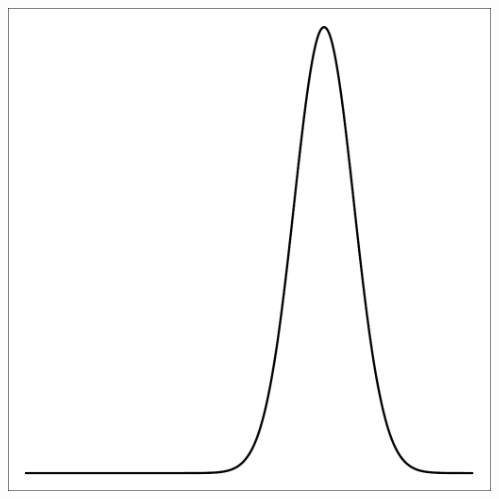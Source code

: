 \documentclass{beamer}
\begin{document}
\begin{frame}[t]
\begin{columns}[c]
\begin{flushright}
            \end{flushright}
            \begin{flushright}
                \includegraphics[width=1\textwidth]{bayesian_update_illustration_th3.pdf}
            \end{flushright}
    \end{columns}
\end{frame}
\end{document}
